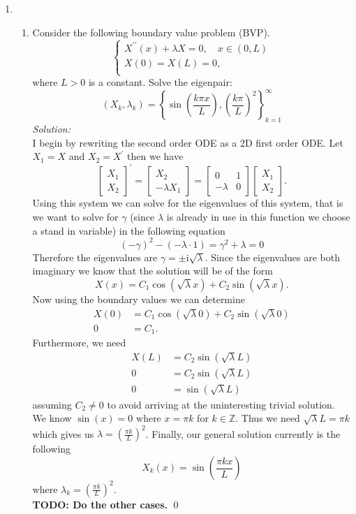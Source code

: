 \documentclass[10pt]{amsart}
\newcommand{\I}{\mathrm{i}}
\theoremstyle{nonumberplain}
\begin{document}
\begin{enumerate}[label={\bf {\arabic*}:}]
\item 
\begin{enumerate}
\item Consider the following boundary value problem (BVP). \\
$$
\begin{cases}
X^{\prime\prime}(x) + \lambda X = 0, \quad x \in (0, L) \\
X(0)  = X(L) = 0, \\
\end{cases}
$$
where $L > 0$ is a constant.
Solve the eigenpair:
$$
(X_k, \lambda_k) = \left\{ \sin \left( \frac {k \pi x}{L} \right), \left(\frac {k \pi}{L} \right)^2 \right\}_{k=1}^\infty
$$
\textit{Solution:} \\
I begin by rewriting the second order ODE as a 2D first order ODE.
Let $X_1 = X$ and $X_2 = X^\prime$ then we have
$$
\begin{bmatrix}
X_1 \\
X_2
\end{bmatrix}^\prime =
\begin{bmatrix}
X_2 \\
-\lambda X_1
\end{bmatrix} =
\begin{bmatrix}
0 &1 \\
-\lambda &0
\end{bmatrix}
\begin{bmatrix}
X_1 \\
X_2
\end{bmatrix}.
$$
Using this system we can solve for the eigenvalues of this system, that is we want to solve for $\gamma$ (since $\lambda$ is already in use in this function we choose a stand in variable) in the following equation
$$
(-\gamma)^2 - (-\lambda \cdot 1) = \gamma^2 + \lambda = 0
$$
Therefore the eigenvalues are $\gamma = \pm \I \sqrt{\lambda}$.
Since the eigenvalues are both imaginary we know that the solution will be of the form
$$
X(x) = C_1 \cos(\sqrt \lambda x) + C_2 \sin(\sqrt \lambda x).
$$
Now using the boundary values we can determine
\begin{align*}
X(0) &= C_1 \cos(\sqrt \lambda 0) + C_2 \sin(\sqrt \lambda 0) \\
0 &= C_1.
\end{align*}
Furthermore, we need
\begin{align*}
X(L) &= C_2 \sin(\sqrt \lambda L) \\
0 &= C_2 \sin(\sqrt \lambda L) \\
0 &= \sin(\sqrt \lambda L)
\end{align*}
assuming $C_2 \neq 0$ to avoid arriving at the uninteresting trivial solution.
We know $\sin(x) = 0$ where $x = \pi k$ for $k \in \mathbb Z$.
Thus we need $\sqrt \lambda L = \pi k$ which gives us $\lambda = \left( \frac {\pi k } L \right)^2$.
Finally, our general solution currently is the following
$$
X_k(x) = \sin \left( \frac{\pi k x} L \right)
$$
where $\lambda_k = \left( \frac {\pi k } L \right)^2$. \\
\textbf{TODO: Do the other cases.}
\qed \\
\newpage


\end{enumerate}
\end{enumerate}
\end{document}
